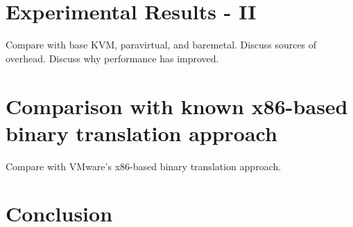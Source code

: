 \documentclass[10pt,twocolumn]{article}
\begin{document}
\section{Experimental Results - II}
Compare with base KVM, paravirtual, and baremetal. Discuss sources of overhead. Discuss
why performance has improved.

\section{Comparison with known x86-based binary translation approach}
Compare with VMware's x86-based binary translation approach.

\section{Conclusion}



\end{document}
